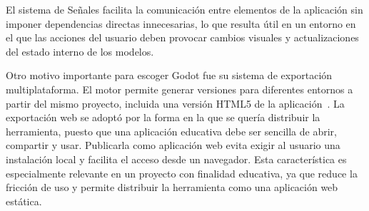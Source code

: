 El sistema de Señales facilita la comunicación entre elementos de la aplicación sin imponer dependencias directas innecesarias, lo que resulta útil en un entorno en el que las acciones del usuario deben provocar cambios visuales y actualizaciones del estado interno de los modelos.



Otro motivo importante para escoger Godot fue su sistema de exportación multiplataforma.
El motor permite generar versiones para diferentes entornos a partir del mismo proyecto, incluida una versión HTML5 de la aplicación~\cite{GodotWebExport}.
La exportación web se adoptó por la forma en la que se quería distribuir la herramienta, puesto que una aplicación educativa debe ser sencilla de abrir, compartir y usar.
Publicarla como aplicación web evita exigir al usuario una instalación local y facilita el acceso desde un navegador.
Esta característica es especialmente relevante en un proyecto con finalidad educativa, ya que reduce la fricción de uso y permite distribuir la herramienta como una aplicación web estática.



